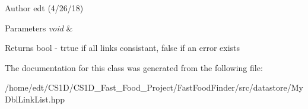 \begin{DoxyAuthor}{Author}
edt (4/26/18)
\end{DoxyAuthor}

\begin{DoxyParams}{Parameters}
{\em void} & \\
\hline
\end{DoxyParams}
\begin{DoxyReturn}{Returns}
bool -\/ trtue if all links consistant, false if an error exists 
\end{DoxyReturn}


The documentation for this class was generated from the following file\-:\begin{DoxyCompactItemize}
\item 
/home/edt/\-C\-S1\-D/\-C\-S1\-D\-\_\-\-Fast\-\_\-\-Food\-\_\-\-Project/\-Fast\-Food\-Finder/src/datastore/My\-Dbl\-Link\-List.\-hpp\end{DoxyCompactItemize}
